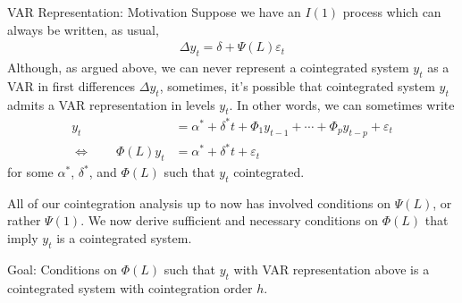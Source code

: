 \documentclass[aspectratio=169, handout]{beamer}
\begin{document}
{\footnotesize
\begin{frame}{VAR Representation: Motivation}
Suppose we have an $I(1)$ process which can always be written, as usual,
\begin{align*}
  \Delta y_t = \delta + \Psi(L)\varepsilon_t
\end{align*}
Although, as argued above, we can never represent a cointegrated system
$y_t$ as a VAR in first differences $\Delta y_t$, sometimes, it's
possible that cointegrated system $y_t$ admits a VAR
representation \alert{in levels} $y_t$.
In other words, we can sometimes write
\begin{align*}
  y_t
  &=
  \alpha^* + \delta^* t
  + \Phi_1 y_{t-1}
  + \cdots
  + \Phi_p y_{t-p}
  + \varepsilon_t
  \\
  \iff\qquad
  \Phi(L)y_t
  &=
  \alpha^* + \delta^* t
  + \varepsilon_t
\end{align*}
for some $\alpha^*$, $\delta^*$, and $\Phi(L)$ such that $y_t$
cointegrated.

All of our cointegration analysis up to now has involved conditions on
$\Psi(L)$, or rather $\Psi(1)$.
We now derive sufficient and necessary conditions on $\Phi(L)$ that
imply $y_t$ is a cointegrated system.

\alert{Goal}:
Conditions on $\Phi(L)$ such that $y_t$ with VAR representation above is
a cointegrated system with cointegration order $h$.
\end{frame}
}
\end{document}
